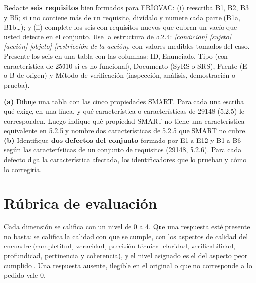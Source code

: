 \documentclass[11pt]{article}
\newcommand{\seccion}[1]{\section{\textcolor{utegreendk}{#1}}}
\begin{document}
\begin{cajatarea}[title={T3. Redacción de requisitos bien formados \hfill D3 · 30\,\%}]

	Redacte \textbf{seis requisitos} bien formados para FRÍOVAC: (i) reescriba B1, B2, B3 y B5; si uno contiene más de un requisito, divídalo y numere cada parte (B1a, B1b\ldots); y (ii) complete los seis con requisitos nuevos que cubran un vacío que usted detecte en el conjunto. Use la estructura de 5.2.4: \emph{[condición] [sujeto] [acción] [objeto] [restricción de la acción]}, con valores medibles tomados del caso.\\[4pt]

	Presente los seis en una tabla con las columnas: ID, Enunciado, Tipo (con característica de 25010 si es no funcional), Documento (SyRS o SRS), Fuente (E o B de origen) y Método de verificación (inspección, análisis, demostración o prueba).

\end{cajatarea}



\begin{cajatarea}[title={T4. Sustento normativo de la calidad \hfill D4 · 20\,\% (junto con las citas de T1 a T3)}]

	\textbf{(a)} Dibuje una tabla con las cinco propiedades SMART. Para cada una escriba qué exige, en una línea, y qué característica o características de 29148 (5.2.5) le corresponden. Luego indique qué propiedad SMART no tiene una característica equivalente en 5.2.5 y nombre dos características de 5.2.5 que SMART no cubre.\\[4pt]

	\textbf{(b)} Identifique \textbf{dos defectos del conjunto} formado por E1 a E12 y B1 a B6 según las características de un conjunto de requisitos (29148, 5.2.6). Para cada defecto diga la característica afectada, los identificadores que lo prueban y cómo lo corregiría.

\end{cajatarea}


\seccion{Rúbrica de evaluación}


Cada dimensión se califica con un nivel de 0 a 4. Que una respuesta esté presente no basta: se califica la calidad con que se cumple, con los aspectos de calidad del encuadre (completitud, veracidad, precisión técnica, claridad, verificabilidad, profundidad, pertinencia y coherencia), y el nivel asignado es el del aspecto peor cumplido \citep{brookhart_2018,panadero_jonsson_2020}. Una respuesta ausente, ilegible en el original o que no corresponde a lo pedido vale 0.
\end{document}
